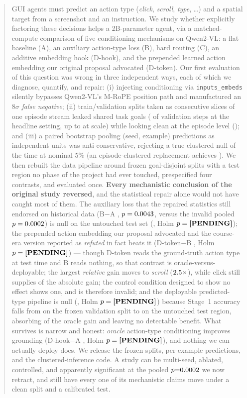 \begin{abstract}
GUI agents must predict an action type (\emph{click}, \emph{scroll},
\emph{type}, \ldots) and a spatial target from a screenshot and an
instruction. We study whether explicitly factoring these decisions helps a
2B-parameter agent, via a matched-compute comparison of five conditioning
mechanisms on Qwen2-VL: a flat baseline (A), an auxiliary action-type loss
(B), hard routing (C), an additive embedding hook (D-hook), and the
prepended learned action embedding our original proposal advocated
(D-token). Our first evaluation of this question was wrong in three
independent ways, each of which we diagnose, quantify, and repair:
(i) injecting conditioning via \texttt{inputs\_embeds} silently bypasses
Qwen2-VL's M-RoPE position path and manufactured an $8\sigma$ \emph{false
negative}; (ii) train/validation splits taken as consecutive slices of one
episode stream leaked shared task goals (\LeakGoalMain{} of validation
steps at the headline setting, up to \LeakGoalMax{} at scale) while looking
clean at the episode level (\LeakEpMain{}); and (iii) a paired bootstrap
pooling (seed, example) predictions as independent units was
anti-conservative, rejecting a true clustered null \TypeIPooled{} of the
time at nominal 5\% (an episode-clustered replacement achieves
\TypeIClustered{}). We then rebuilt the data pipeline around frozen
goal-disjoint splits with a test region no phase of the project had ever
touched, prespecified four contrasts, and evaluated once. \textbf{Every
mechanistic conclusion of the original study reversed}, and the statistical
repair alone would not have caught most of them. The auxiliary loss that the repaired
statistics still endorsed on historical data (B$-$A \ExpBvsA{},
$p=\ExpBvsAp$, versus the invalid pooled $p=\ExpBvsApooled$) is null on the
untouched test set (\ConfBvsA{}, Holm $p=\ConfBvsAHolm$); the prepended
action embedding our proposal advocated and the course-era version reported
as \emph{refuted} in fact beats it (D-token$-$B \ConfDtvsB{}, Holm
$p=\ConfDtvsBHolm$) --- though D-token reads the ground-truth action type at
test time and B reads nothing, so that contrast is oracle-versus-deployable;
the largest \emph{relative} gain moves to \emph{scroll}
($\ConfScrollFold\times$), while click still supplies \ConfClickAbsShare{} of
the absolute gain; the control condition designed to show no
effect shows one, and is therefore invalid; and the deployable
predicted-type pipeline is null (\ConfEtoEvsA{}, Holm
$p=\ConfEtoEvsAHolm$) because Stage~1 accuracy falls from
\ConfStageOneValAcc{} on the frozen validation split to \ConfStageOneAcc{}
on the untouched test region, absorbing \ConfEtoEGapShare{} of the oracle
gain and leaving no detectable benefit. What survives is narrow and honest:
\emph{oracle} action-type conditioning improves grounding
(D-hook$-$A \ConfDhvsA{}, Holm $p=\ConfDhvsAHolm$), and nothing we can
actually deploy does. We release the frozen splits, per-example
predictions, and the clustered-inference code. A study can be multi-seed,
ablated, controlled, and apparently significant at the pooled
$p{=}\ExpBvsApooled{}$ we now retract, and still have every one of its
mechanistic claims move under a clean split and a calibrated test.
\end{abstract}

